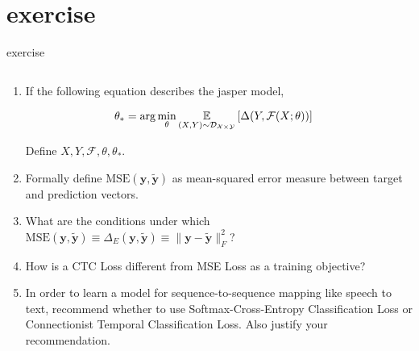 \documentclass[aspectratio=169,xcolor={dvipsnames,svgnames}]{beamer}
\begin{document}
\section{exercise}
\label{sec:org351d872}
\begin{frame}[label={sec:exercise}]{exercise}
\begin{columns}
\begin{column}{0.45\columnwidth}
\begin{enumerate}[<only@+>]
\item If the following equation describes the jasper
model,

\begin{align}
  \notag
  \theta_*
  &= \arg\min_{\theta} \underset {(X,Y) \sim
    \mathcal{D}_{\mathcal{X}\times\mathcal{Y}}}
    {\mathbb{E}} \left[ \Delta(Y,
    \mathcal{F}(X;\theta)) \right]
\end{align}

Define \(X, Y, \mathcal{F}, \theta, \theta_*\).
\item Formally define \(\mathrm{MSE} (\mathbf{y},
   \widetilde{\mathbf{y}})\) as mean-squared error
measure between target and prediction vectors.
\item What are the conditions under which \(\mathrm{MSE}
   (\mathbf{y}, \widetilde{\mathbf{y}}) \equiv \Delta_E
   (\mathbf{y}, \widetilde{\mathbf{y}}) \equiv
   \|\mathbf{y} - \widetilde{\mathbf{y}}\|_F^2\)?
\item How is a CTC Loss different from MSE Loss as a
training objective?
\item In order to learn a model for sequence-to-sequence
mapping like speech to text, recommend whether to
use Softmax-Cross-Entropy Classification Loss or
Connectionist Temporal Classification Loss.  Also
justify your recommendation.
\end{enumerate}
\end{column}
\end{columns}
\end{frame}
\end{document}
